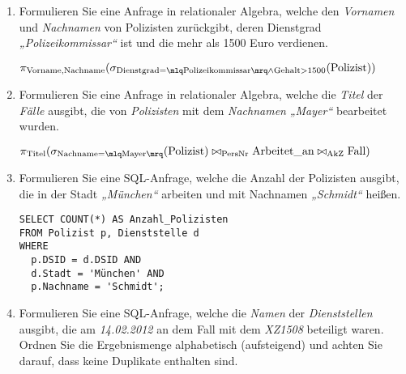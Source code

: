 \documentclass{lehramt-informatik-aufgabe}
\begin{document}
\begin{enumerate}


\item Formulieren Sie eine Anfrage in relationaler
Algebra, welche den \emph{Vornamen} und
\emph{Nachnamen} von Polizisten zurückgibt, deren Dienstgrad
\emph{„Polizeikommissar“} ist und die mehr als 1500 Euro verdienen.

\begin{antwort}
$\pi_{\text{Vorname,Nachname}}(
  \sigma_{
    \text{Dienstgrad} = \mlq \text{Polizeikommissar} \mrq
      \land
    \text{Gehalt} > 1500
  }(\text{Polizist})
)$
\end{antwort}


\item Formulieren Sie eine Anfrage in relationaler Algebra, welche die
\emph{Titel} der \emph{Fälle} ausgibt, die von \emph{Polizisten} mit dem
\emph{Nachnamen} \emph{„Mayer“} bearbeitet wurden.

\begin{antwort}
$
\pi_{\text{Titel}}(
  \sigma_{\text{Nachname} = \mlq \text{Mayer} \mrq}(\text{Polizist})
  \bowtie_{\text{PersNr}}
  \text{Arbeitet\_an}
  \bowtie_{\text{AkZ}}
  \text{Fall}
)
$
\end{antwort}


\item Formulieren Sie eine SQL-Anfrage, welche die Anzahl der
Polizisten ausgibt, die in der Stadt \emph{„München“} arbeiten und mit
Nachnamen \emph{„Schmidt“} heißen.

\begin{antwort}
\begin{verbatim}
SELECT COUNT(*) AS Anzahl_Polizisten
FROM Polizist p, Dienststelle d
WHERE
  p.DSID = d.DSID AND
  d.Stadt = 'München' AND
  p.Nachname = 'Schmidt';
\end{verbatim}
\end{antwort}


\item Formulieren Sie eine SQL-Anfrage, welche die \emph{Namen} der
\emph{Dienststellen} ausgibt, die am \emph{14.02.2012} an dem Fall mit
dem \emph{XZ1508} beteiligt waren. Ordnen Sie die Ergebnismenge
alphabetisch (aufsteigend) und achten Sie darauf, dass keine Duplikate
enthalten sind.


\end{enumerate}
\end{document}

